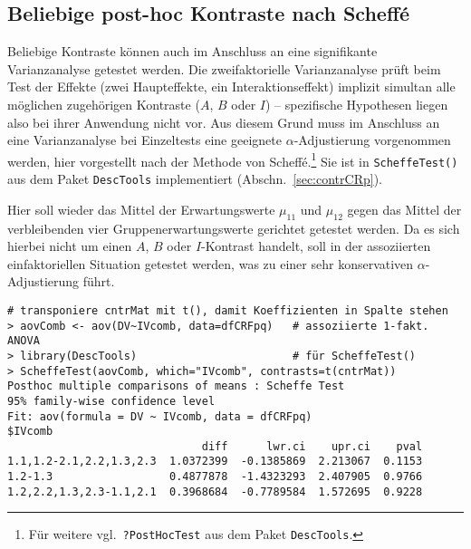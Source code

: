 \subsection{Beliebige post-hoc Kontraste nach Scheffé}

Beliebige Kontraste können auch im Anschluss an eine signifikante Varianzanalyse getestet werden. Die zweifaktorielle Varianzanalyse prüft beim Test der Effekte (zwei Haupteffekte, ein Interaktionseffekt) implizit simultan alle möglichen zugehörigen Kontraste ($A$, $B$ oder $I$) -- spezifische Hypothesen liegen also bei ihrer Anwendung nicht vor. Aus diesem Grund muss im Anschluss an eine Varianzanalyse bei Einzeltests eine geeignete $\alpha$-Adjustierung vorgenommen werden, hier vorgestellt nach der Methode von Scheffé.\footnote{Für weitere vgl.\ \lstinline!?PostHocTest! aus dem Paket \lstinline!DescTools!.} Sie ist in \lstinline!ScheffeTest()! aus dem Paket \lstinline!DescTools! implementiert (Abschn.\ \ref{sec:contrCRp}).

Hier soll wieder das Mittel der Erwartungswerte $\mu_{11}$ und $\mu_{12}$ gegen das Mittel der verbleibenden vier Gruppenerwartungswerte gerichtet getestet werden. Da es sich hierbei nicht um einen $A$, $B$ oder $I$-Kontrast handelt, soll in der assoziierten einfaktoriellen Situation getestet werden, was zu einer sehr konservativen $\alpha$-Adjustierung führt.
\begin{lstlisting}
# transponiere cntrMat mit t(), damit Koeffizienten in Spalte stehen
> aovComb <- aov(DV~IVcomb, data=dfCRFpq)   # assoziierte 1-fakt. ANOVA
> library(DescTools)                        # für ScheffeTest()
> ScheffeTest(aovComb, which="IVcomb", contrasts=t(cntrMat))
Posthoc multiple comparisons of means : Scheffe Test
95% family-wise confidence level
Fit: aov(formula = DV ~ IVcomb, data = dfCRFpq)
$IVcomb
                              diff      lwr.ci    upr.ci    pval
1.1,1.2-2.1,2.2,1.3,2.3  1.0372399  -0.1385869  2.213067  0.1153
1.2-1.3                  0.4877878  -1.4323293  2.407905  0.9766
1.2,2.2,1.3,2.3-1.1,2.1  0.3968684  -0.7789584  1.572695  0.9228
\end{lstlisting}

